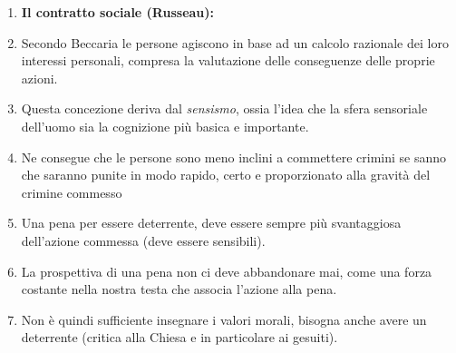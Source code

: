\documentclass{article}
\begin{document}
\begin{enumerate}
    \item \textbf{Il contratto sociale (Russeau):}
    \item Secondo Beccaria le persone agiscono in base ad un calcolo razionale dei loro interessi personali, compresa la valutazione delle conseguenze delle proprie azioni.
    \item Questa concezione deriva dal \textit{sensismo}, ossia l'idea che la sfera sensoriale dell'uomo sia la cognizione più basica e importante.
    \item Ne consegue che le persone sono meno inclini a commettere crimini se sanno che saranno punite in modo rapido, certo e proporzionato alla gravità del crimine commesso
    \item Una pena per essere deterrente, deve essere sempre più svantaggiosa dell'azione commessa (deve essere sensibili).
    \item La prospettiva di una pena non ci deve abbandonare mai, come una forza costante nella nostra testa che associa l'azione alla pena.
    \item Non è quindi sufficiente insegnare i valori morali, bisogna anche avere un deterrente (critica alla Chiesa e in particolare ai gesuiti).
\end{enumerate}

\phantom{}
\end{document}
